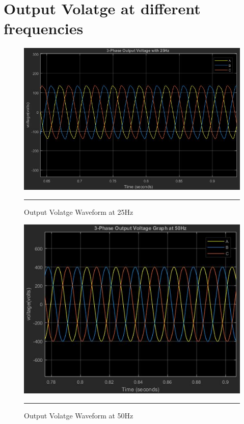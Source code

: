 \section{Output Volatge at different frequencies}
\begin{figure}[htbp]
	\centering
	\includegraphics[width = 6in]{./Figures/25freq.JPG}
	\rule{35em}{1pt}
	\caption{Output Volatge Waveform at 25Hz}
\end{figure}
\begin{figure}[htbp]
	\centering
	\includegraphics[width = 6in]{./Figures/50freq.JPG}
	\rule{35em}{1pt}
	\caption{Output Volatge Waveform at 50Hz}
\end{figure}
